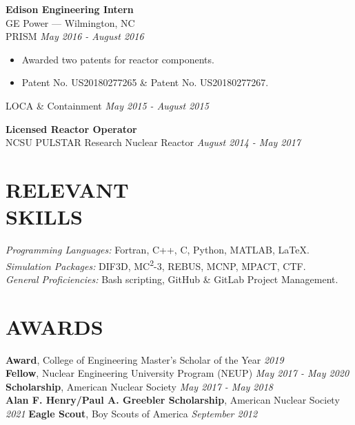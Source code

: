 \documentclass[margin, 10pt]{res}
\newcommand{\backwardspace}{-8pt}
\begin{document}
\begin{resume}
\vspace{\backwardspace}
\textbf{Edison Engineering Intern} \\
GE Power --- Wilmington, NC \\
PRISM \hfill \textit{May 2016 - August 2016}\\
\vspace{\backwardspace}
\begin{itemize}
    \item Awarded two patents for reactor components.
    \item Patent No. US20180277265 \& Patent No. US20180277267.
\end{itemize}
\vspace{\backwardspace}
LOCA \& Containment \hfill \textit{May 2015 - August 2015}

\vspace{\backwardspace}
\textbf{Licensed Reactor Operator} \\
NCSU PULSTAR Research Nuclear Reactor \hfill \textit{August 2014 - May 2017}


\vspace{-0.125in}
\section{RELEVANT \\ SKILLS}
{\sl Programming Languages:} Fortran, C++, C, Python, MATLAB, \LaTeX. \\
{\sl Simulation Packages:} DIF3D, MC\textsuperscript{2}-3, REBUS, MCNP, MPACT, CTF. \\
{\sl General Proficiencies:} Bash scripting, GitHub \& GitLab Project Management.

\vspace{-0.125in}
\section{AWARDS}
\textbf{Award}, College of Engineering Master's Scholar of the Year \hfill \textit{2019} \\
\textbf{Fellow}, Nuclear Engineering University Program (NEUP) \hfill \textit{May 2017 - May 2020} \\
\textbf{Scholarship}, American Nuclear Society \hfill \textit{May 2017 - May 2018} \\
\textbf{Alan F. Henry/Paul A. Greebler Scholarship}, American Nuclear Society \hfill \textit{2021}
\textbf{Eagle Scout}, Boy Scouts of America \hfill \textit{September 2012}

\end{resume}
\end{document}

